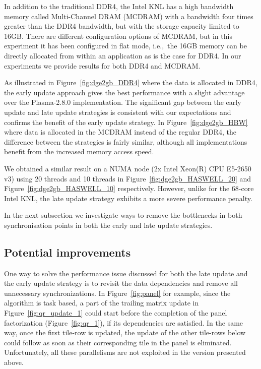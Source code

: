 In addition to the traditional DDR4, the Intel KNL has a high
bandwidth memory called Multi-Channel DRAM (MCDRAM) with a
bandwidth four times greater than the DDR4 bandwidth,
but with the storage capacity limited to 16GB.
There are different configuration options
of MCDRAM, but in this experiment it has been configured
in flat mode, i\@.e\@.,~the 16GB memory can be directly allocated from within
an application as is the case for DDR4.
In our experiments we provide results for both DDR4 and MCDRAM.

As illustrated in Figure~\ref{fig:dge2gb_DDR4} where the data is
allocated in DDR4, the early update approach gives the best
performance with a slight advantage over the Plasma-2.8.0
implementation.
The significant gap between the early update and late update
strategies is consistent with our expectations
and confirms the benefit of the early update strategy.
In Figure~\ref{fig:dge2gb_HBW} where data is allocated in
the MCDRAM instead of the regular DDR4, the difference between the
strategies is fairly similar,
although all implementations benefit from the increased memory access
speed.

We obtained a similar result on a NUMA node (2x Intel Xeon(R)
CPU E5-2650 v3) using 20 threads and 10 threads in
Figure~\ref{fig:dge2gb_HASWELL_20} and
Figure~\ref{fig:dge2gb_HASWELL_10} respectively.
However, unlike for the 68-core Intel KNL,
the late update strategy exhibits a more severe
performance penalty.

In the next subsection we investigate ways to remove
the bottlenecks in both synchronisation points in both
the early and late update strategies.

\subsection{Potential improvements}
One way to solve the performance issue discussed for both the
late update and the early update strategy is to revisit the
data dependencies and remove all unnecessary synchronizations.
In Figure~\ref{fig:panel} for example,
since the algorithm is task based,
a part of the trailing matrix update in Figure~\ref{fig:qr_update_1}
could start before the completion of the panel factorization
(Figure~\ref{fig:qr_1}), if its dependencies are satisfied.
In the same way,
once the first tile-row is updated,
the update of the other tile-rows below could follow as
soon as their corresponding tile in the panel is eliminated.
Unfortunately, all these parallelisms are not exploited
in the version presented above.

